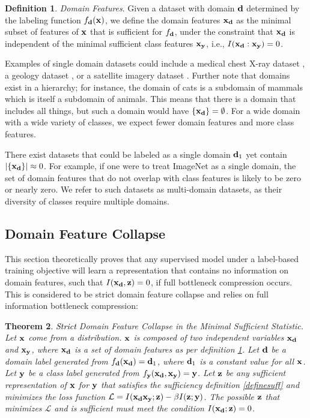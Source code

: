 \documentclass[letterpaper]{article} %
\theoremstyle{plain}
\newtheorem{theorem}{Theorem}[section]
\theoremstyle{definition}
\newtheorem{definition}[theorem]{Definition}
\theoremstyle{remark}
\begin{document}
\begin{definition}
\emph{Domain Features}. Given a dataset with domain ${\mathbf{d}}$ determined by the labeling function $f_{{\mathbf{d}}}({\mathbf{x}})$, we define the domain features ${\mathbf{x}}_{\mathbf{d}}$ as the minimal subset of features of ${\mathbf{x}}$ that is sufficient for $f_{{\mathbf{d}}}$, under the constraint that ${\mathbf{x}}_{\mathbf{d}}$ is independent of the minimal sufficient class features ${\mathbf{x}}_{\mathbf{y}}$, i.e., $I({\mathbf{x}}_{\mathbf{d}} : {\mathbf{x}}_{\mathbf{y}}) = 0$. 
\label{definedomainfeatures}
\end{definition}

Examples of single domain datasets could include a medical chest X-ray dataset \citep{yang2023medmnist}, a geology dataset \citep{rock_data}, or a satellite imagery dataset \citep{helber2019eurosat}. Further note that domains exist in a hierarchy; for instance, the domain of cats is a subdomain of mammals which is itself a subdomain of animals. This means that there is a domain that includes all things, but such a domain would have $\{{\mathbf{x}}_{\mathbf{d}}\} = \emptyset$. For a wide domain with a wide variety of classes, we expect fewer domain features and more class features. 

There exist datasets that could be labeled as a single domain ${\mathbf{d}}_1$ yet contain $|\{{\mathbf{x}}_{\mathbf{d}}\}| \approx 0$. For example, if one were to treat ImageNet as a single domain, the set of domain features that do not overlap with class features is likely to be zero or nearly zero. We refer to such datasets as multi-domain datasets, as their diversity of classes require multiple domains. 

\subsection{Domain Feature Collapse}

This section theoretically proves that any supervised model under a label-based training objective will learn a representation that contains no information on domain features, such that $I({\mathbf{x}}_{\mathbf{d}}, {\mathbf{z}}) = 0$, if full bottleneck compression occurs. This is considered to be strict domain feature collapse and relies on full information bottleneck compression: 
\begin{theorem} \textcolor{black}{Strict} Domain Feature Collapse in the Minimal Sufficient Statistic. \\
    Let ${\mathbf{x}}$ come from a distribution. ${\mathbf{x}}$ is composed of two independent variables ${\mathbf{x}}_{\mathbf{d}}$ and ${\mathbf{x}}_{\mathbf{y}}$, where ${\mathbf{x}}_{\mathbf{d}}$ is a set of domain features as per definition \ref{definedomainfeatures}. Let ${\mathbf{d}}$ be a domain label generated from $f_{\mathbf{d}}({\mathbf{x}}_{\mathbf{d}}) = {\mathbf{d}}_1$, where ${\mathbf{d}}_1$ is a constant value for all ${\mathbf{x}}$. Let ${\mathbf{y}}$ be a class label generated from $f_{\mathbf{y}}({\mathbf{x}}_{\mathbf{d}}, {\mathbf{x}}_{\mathbf{y}}) = {\mathbf{y}}$. Let ${\mathbf{z}}$ be any sufficient representation of ${\mathbf{x}}$ for ${\mathbf{y}}$ that satisfies the sufficiency definition \ref{definesuff} and minimizes the loss function $\mathcal{L} = I({\mathbf{x}}_{\mathbf{d}} {\mathbf{x}}_{\mathbf{y}}; {\mathbf{z}}) - \beta I({\mathbf{z}};{\mathbf{y}})$. The possible ${\mathbf{z}}$ that minimizes $\mathcal{L}$ and is sufficient must meet the condition $I({\mathbf{x}}_{\mathbf{d}}; {\mathbf{z}}) = 0$. 



    \label{mainbodygenloss}
\end{theorem}
\end{document}
